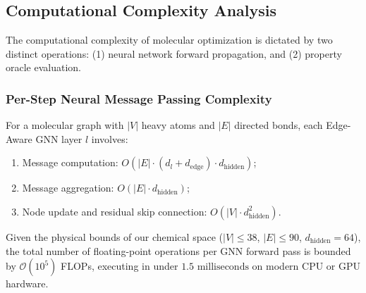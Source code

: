 \documentclass{ieeeaccess}
\begin{document}
\subsection{Computational Complexity Analysis}
The computational complexity of molecular optimization is dictated by two distinct operations: (1) neural network forward propagation, and (2) property oracle evaluation.

\subsubsection{Per-Step Neural Message Passing Complexity}
For a molecular graph with $|V|$ heavy atoms and $|E|$ directed bonds, each Edge-Aware GNN layer $l$ involves:
\begin{enumerate}
    \item Message computation: $O(|E| \cdot (d_l + d_{\text{edge}}) \cdot d_{\text{hidden}})$;
    \item Message aggregation: $O(|E| \cdot d_{\text{hidden}})$;
    \item Node update and residual skip connection: $O(|V| \cdot d_{\text{hidden}}^2)$.
\end{enumerate}
Given the physical bounds of our chemical space ($|V| \le 38$, $|E| \le 90$, $d_{\text{hidden}} = 64$), the total number of floating-point operations per GNN forward pass is bounded by $\mathcal{O}(10^5)$ FLOPs, executing in under $1.5\text{ milliseconds}$ on modern CPU or GPU hardware.
\end{document}
